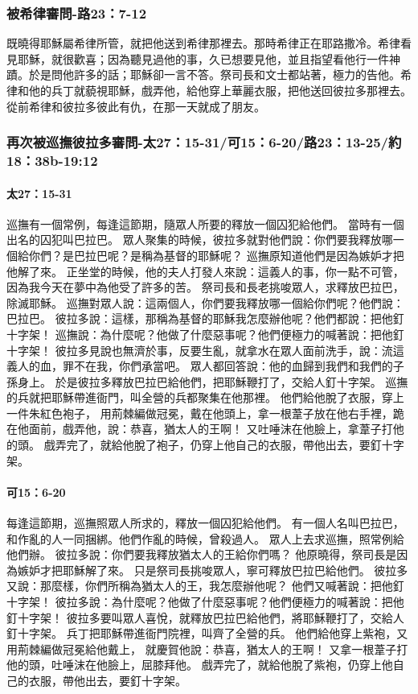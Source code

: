 \subsubsection{被希律審問-路23：7-12}
既曉得耶穌屬希律所管，就把他送到希律那裡去。那時希律正在耶路撒冷。希律看見耶穌，就很歡喜；因為聽見過他的事，久已想要見他，並且指望看他行一件神蹟。於是問他許多的話；耶穌卻一言不答。祭司長和文士都站著，極力的告他。希律和他的兵丁就藐視耶穌，戲弄他，給他穿上華麗衣服，把他送回彼拉多那裡去。從前希律和彼拉多彼此有仇，在那一天就成了朋友。


\subsubsection{再次被巡撫彼拉多審問-太27：15-31/可15：6-20/路23：13-25/約18：38b-19:12}
\paragraph{太27：15-31}巡撫有一個常例，每逢這節期，隨眾人所要的釋放一個囚犯給他們。
當時有一個出名的囚犯叫巴拉巴。
眾人聚集的時候，彼拉多就對他們說：你們要我釋放哪一個給你們？是巴拉巴呢？是稱為基督的耶穌呢？
巡撫原知道他們是因為嫉妒才把他解了來。
正坐堂的時候，他的夫人打發人來說：這義人的事，你一點不可管，因為我今天在夢中為他受了許多的苦。
祭司長和長老挑唆眾人，求釋放巴拉巴，除滅耶穌。
巡撫對眾人說：這兩個人，你們要我釋放哪一個給你們呢？他們說：巴拉巴。
彼拉多說：這樣，那稱為基督的耶穌我怎麼辦他呢？他們都說：把他釘十字架！
巡撫說：為什麼呢？他做了什麼惡事呢？他們便極力的喊著說：把他釘十字架！
彼拉多見說也無濟於事，反要生亂，就拿水在眾人面前洗手，說：流這義人的血，罪不在我，你們承當吧。
眾人都回答說：他的血歸到我們和我們的子孫身上。
於是彼拉多釋放巴拉巴給他們，把耶穌鞭打了，交給人釘十字架。
巡撫的兵就把耶穌帶進衙門，叫全營的兵都聚集在他那裡。
他們給他脫了衣服，穿上一件朱紅色袍子，
用荊棘編做冠冕，戴在他頭上，拿一根葦子放在他右手裡，跪在他面前，戲弄他，說：恭喜，猶太人的王啊！
又吐唾沫在他臉上，拿葦子打他的頭。
戲弄完了，就給他脫了袍子，仍穿上他自己的衣服，帶他出去，要釘十字架。

\paragraph{可15：6-20}每逢這節期，巡撫照眾人所求的，釋放一個囚犯給他們。
有一個人名叫巴拉巴，和作亂的人一同捆綁。他們作亂的時候，曾殺過人。
眾人上去求巡撫，照常例給他們辦。
彼拉多說：你們要我釋放猶太人的王給你們嗎？
他原曉得，祭司長是因為嫉妒才把耶穌解了來。
只是祭司長挑唆眾人，寧可釋放巴拉巴給他們。
彼拉多又說：那麼樣，你們所稱為猶太人的王，我怎麼辦他呢？
他們又喊著說：把他釘十字架！
彼拉多說：為什麼呢？他做了什麼惡事呢？他們便極力的喊著說：把他釘十字架！
彼拉多要叫眾人喜悅，就釋放巴拉巴給他們，將耶穌鞭打了，交給人釘十字架。
兵丁把耶穌帶進衙門院裡，叫齊了全營的兵。
他們給他穿上紫袍，又用荊棘編做冠冕給他戴上，
就慶賀他說：恭喜，猶太人的王啊！
又拿一根葦子打他的頭，吐唾沫在他臉上，屈膝拜他。
戲弄完了，就給他脫了紫袍，仍穿上他自己的衣服，帶他出去，要釘十字架。

